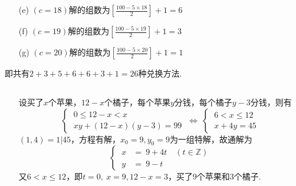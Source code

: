 \documentclass[UTF8]{ctexart}
\begin{document}
\begin{enumerate}
\begin{enumerate}
\begin{comment}
                    a&=7 ;\\
                    b&=4 ;\\
                    c&=17 ;
                \end{cases}
                \quad
                \begin{cases}
                    a&=9 ;\\
                    b&=3 ;\\
                    c&=17 ;
                \end{cases}
                \quad
                \begin{cases}
                    a&=11 ;\\
                    b&=2 ;\\
                    c&=17 ;
                \end{cases}
            \]\end{comment}
            \item [(e)]$(c=18)$解的组数为$\left[\displaystyle{\frac{100-5\times 18}{2}}\right]+1=6$
            \item [(f)]$(c=19)$解的组数为$\left[\displaystyle{\frac{100-5\times 19}{2}}\right]+1=3$
            \item [(g)]$(c=20)$解的组数为$\left[\displaystyle{\frac{100-5\times 20}{2}}\right]+1=1$
        \end{enumerate}
        即共有$2+3+5+6+6+3+1=26$种兑换方法.
    \end{enumerate}

\subsection{}   %
\begin{enumerate}
    \item []设买了$x$个苹果，$12-x$个橘子，每个苹果$y$分钱，每个橘子$y-3$分钱，则有
    \[
        \begin{cases}
            \ 0 \leq 12-x  < x \\
            \ xy + (12-x)(y-3)  = 99
        \end{cases}
        \ \Leftrightarrow\
        \begin{cases}
            \ 6 < x \leq 12 \\
            \ x + 4y = 45
        \end{cases} 
    \]
    $(1,4)=1|45$，方程有解，$x_0=9,y_0=9$为一组特解，故通解为
    \[
        \begin{cases}
            \ x & =\  9 + 4t \quad (t\in \mathbb{Z})\\
            \ y & =\  9 - t
        \end{cases}
    \]
    又$6 < x \leq 12 $，即$t=0,\ x=9,12-x=3$，买了9个苹果和3个橘子.
\end{enumerate}
\end{document}
